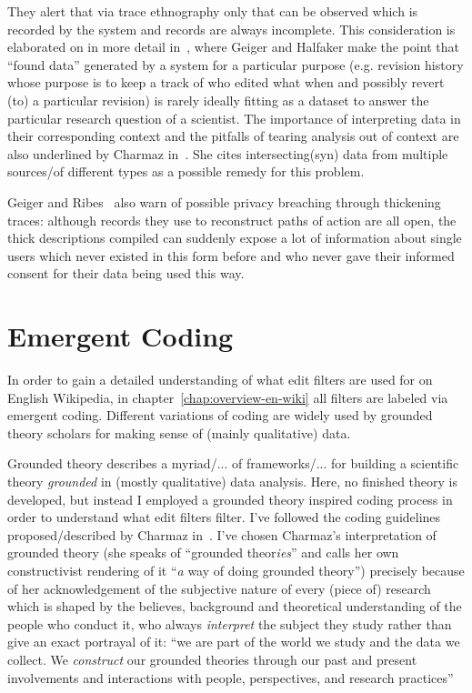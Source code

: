 They alert that via trace ethnography only that can be observed which is recorded by the system and records are always incomplete.
This consideration is elaborated on in more detail in~\cite{GeiHal2017}, where Geiger and Halfaker make the point that ``found data'' generated by a system for a particular purpose (e.g. revision history whose purpose is to keep a track of who edited what when and possibly revert (to) a particular revision) is rarely ideally fitting as a dataset to answer the particular research question of a scientist.
The importance of interpreting data in their corresponding context and the pitfalls of tearing analysis out of context are also underlined by Charmaz in~\cite{Charmaz2006}.
She cites intersecting(syn) data from multiple sources/of different types as a possible remedy for this problem. %

Geiger and Ribes~\cite{GeiRib2011} also warn of possible privacy breaching through thickening traces:
although records they use to reconstruct paths of action are all open, the thick descriptions compiled can suddenly expose a lot of information about single users which never existed in this form before and who never gave their informed consent for their data being used this way.


\section{Emergent Coding}
\label{sec:gt}

In order to gain a detailed understanding of what edit filters are used for on English Wikipedia, in chapter~\ref{chap:overview-en-wiki} all filters are labeled via emergent coding.
Different variations of coding are widely used by grounded theory scholars for making sense of (mainly qualitative) data.

Grounded theory describes a myriad/... of frameworks/... for building a scientific theory \emph{grounded} in (mostly qualitative) data analysis.
Here, no finished theory is developed, but instead I employed a grounded theory inspired coding process in order to understand what edit filters filter.
I've followed the coding guidelines proposed/described by Charmaz in~\cite[p.42-71]{Charmaz2006}.
I've chosen Charmaz's interpretation of grounded theory (she speaks of ``grounded theor\emph{ies}'' and calls her own constructivist rendering of it ``\emph{a} way of doing grounded theory'') precisely because of her acknowledgement of the subjective nature of every (piece of) research which is shaped by the believes, background and theoretical understanding of the people who conduct it, who always \emph{interpret} the subject they study rather than give an exact portrayal of it:
``we are part of the world we study and the data we collect. We \textit{construct} our grounded theories through our past and present involvements and interactions with people, perspectives, and research practices''~\cite[p.10]{Charmaz2006}

